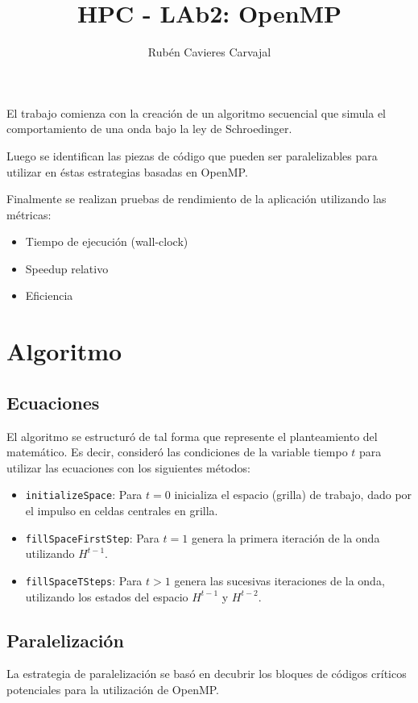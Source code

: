 \documentclass[jou]{apa6}
\title{HPC - LAb2: OpenMP}
\author{Rubén Cavieres Carvajal}
\affiliation{Universidad de Santiago de Chile}
\begin{document}
\maketitle
El trabajo comienza con la creación de un algoritmo secuencial que simula el comportamiento de una onda bajo la ley de Schroedinger.

Luego se identifican las piezas de código que pueden ser paralelizables para utilizar en éstas estrategias basadas en OpenMP.

Finalmente se realizan pruebas de rendimiento de la aplicación utilizando las métricas:

\begin{itemize}
	\item Tiempo de ejecución (wall-clock)
	\item Speedup relativo
	\item Eficiencia
\end{itemize}


\section{Algoritmo}
\subsection{Ecuaciones}
El algoritmo se estructuró de tal forma que represente el planteamiento del matemático. Es decir, consideró las condiciones de la variable tiempo $t$ para utilizar las ecuaciones con los siguientes métodos:

\begin{itemize}
	\item \texttt{initializeSpace}: Para $t = 0$ inicializa el espacio (grilla) de trabajo, dado por el impulso en celdas centrales en grilla.
	\item \texttt{fillSpaceFirstStep}: Para $t = 1$ genera la primera iteración de la onda utilizando $H^{t-1}$.
	\item \texttt{fillSpaceTSteps}: Para $t > 1$ genera las sucesivas iteraciones de la onda, utilizando los estados del espacio $H^{t-1}$ y $H^{t-2}$.
\end{itemize}

\subsection{Paralelización}
La estrategia de paralelización se basó en decubrir los bloques de códigos críticos potenciales para la utilización de OpenMP.
\end{document}
